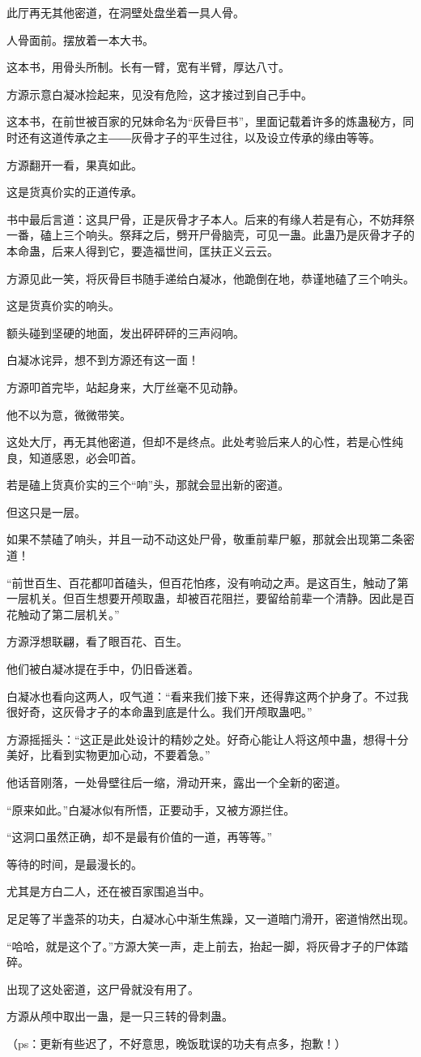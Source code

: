 \begin{this_body}
此厅再无其他密道，在洞壁处盘坐着一具人骨。

人骨面前。摆放着一本大书。

这本书，用骨头所制。长有一臂，宽有半臂，厚达八寸。

方源示意白凝冰捡起来，见没有危险，这才接过到自己手中。

这本书，在前世被百家的兄妹命名为“灰骨巨书”，里面记载着许多的炼蛊秘方，同时还有这道传承之主――灰骨才子的平生过往，以及设立传承的缘由等等。

方源翻开一看，果真如此。

这是货真价实的正道传承。

书中最后言道：这具尸骨，正是灰骨才子本人。后来的有缘人若是有心，不妨拜祭一番，磕上三个响头。祭拜之后，劈开尸骨脑壳，可见一蛊。此蛊乃是灰骨才子的本命蛊，后来人得到它，要造福世间，匡扶正义云云。

方源见此一笑，将灰骨巨书随手递给白凝冰，他跪倒在地，恭谨地磕了三个响头。

这是货真价实的响头。

额头碰到坚硬的地面，发出砰砰砰的三声闷响。

白凝冰诧异，想不到方源还有这一面！

方源叩首完毕，站起身来，大厅丝毫不见动静。

他不以为意，微微带笑。

这处大厅，再无其他密道，但却不是终点。此处考验后来人的心性，若是心性纯良，知道感恩，必会叩首。

若是磕上货真价实的三个“响”头，那就会显出新的密道。

但这只是一层。

如果不禁磕了响头，并且一动不动这处尸骨，敬重前辈尸躯，那就会出现第二条密道！

“前世百生、百花都叩首磕头，但百花怕疼，没有响动之声。是这百生，触动了第一层机关。但百生想要开颅取蛊，却被百花阻拦，要留给前辈一个清静。因此是百花触动了第二层机关。”

方源浮想联翩，看了眼百花、百生。

他们被白凝冰提在手中，仍旧昏迷着。

白凝冰也看向这两人，叹气道：“看来我们接下来，还得靠这两个护身了。不过我很好奇，这灰骨才子的本命蛊到底是什么。我们开颅取蛊吧。”

方源摇摇头：“这正是此处设计的精妙之处。好奇心能让人将这颅中蛊，想得十分美好，比看到实物更加心动，不要着急。”

他话音刚落，一处骨壁往后一缩，滑动开来，露出一个全新的密道。

“原来如此。”白凝冰似有所悟，正要动手，又被方源拦住。

“这洞口虽然正确，却不是最有价值的一道，再等等。”

等待的时间，是最漫长的。

尤其是方白二人，还在被百家围追当中。

足足等了半盏茶的功夫，白凝冰心中渐生焦躁，又一道暗门滑开，密道悄然出现。

“哈哈，就是这个了。”方源大笑一声，走上前去，抬起一脚，将灰骨才子的尸体踏碎。

出现了这处密道，这尸骨就没有用了。

方源从颅中取出一蛊，是一只三转的骨刺蛊。

（ps：更新有些迟了，不好意思，晚饭耽误的功夫有点多，抱歉！）

\end{this_body}

